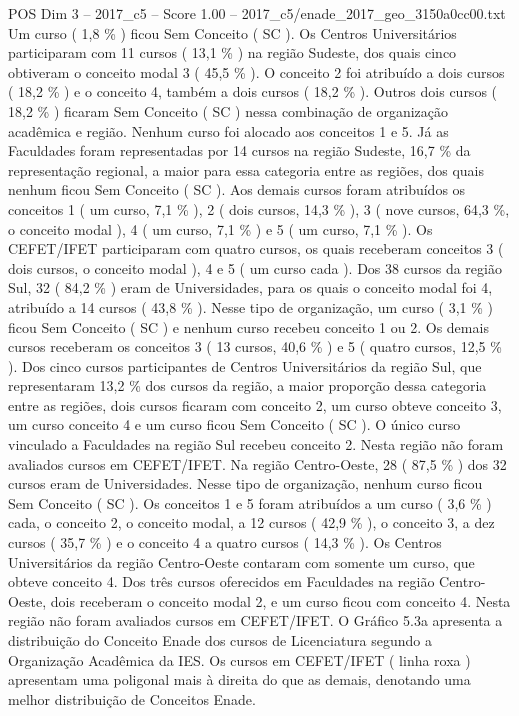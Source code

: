 \begin{textsample}{POS Dim 3 – 2017\_c5 – Score 1.00 – 2017\_c5/enade\_2017\_geo\_3150a0cc00.txt}
Um curso ( 1,8 \% ) ficou Sem Conceito ( SC ).
Os Centros Universitários participaram com 11 cursos ( 13,1 \% ) na região Sudeste, dos quais cinco obtiveram o conceito modal 3 ( 45,5 \% ).
O conceito 2 foi atribuído a dois cursos ( 18,2 \% ) e o conceito 4, também a dois cursos ( 18,2 \% ).
Outros dois cursos ( 18,2 \% ) ficaram Sem Conceito ( SC ) nessa combinação de organização acadêmica e região.
Nenhum curso foi alocado aos conceitos 1 e 5.
Já as Faculdades foram representadas por 14 cursos na região Sudeste, 16,7 \% da representação regional, a maior para essa categoria entre as regiões, dos quais nenhum ficou Sem Conceito ( SC ).
Aos demais cursos foram atribuídos os conceitos 1 ( um curso, 7,1 \% ), 2 ( dois cursos, 14,3 \% ), 3 ( nove cursos, 64,3 \%, o conceito modal ), 4 ( um curso, 7,1 \% ) e 5 ( um curso, 7,1 \% ).
Os CEFET/IFET participaram com quatro cursos, os quais receberam conceitos 3 ( dois cursos, o conceito modal ), 4 e 5 ( um curso cada ).
Dos 38 cursos da região Sul, 32 ( 84,2 \% ) eram de Universidades, para os quais o conceito modal foi 4, atribuído a 14 cursos ( 43,8 \% ).
Nesse tipo de organização, um curso ( 3,1 \% ) ficou Sem Conceito ( SC ) e nenhum curso recebeu conceito 1 ou 2.
Os demais cursos receberam os conceitos 3 ( 13 cursos, 40,6 \% ) e 5 ( quatro cursos, 12,5 \% ).
Dos cinco cursos participantes de Centros Universitários da região Sul, que representaram 13,2 \% dos cursos da região, a maior proporção dessa categoria entre as regiões, dois cursos ficaram com conceito 2, um curso obteve conceito 3, um curso conceito 4 e um curso ficou Sem Conceito ( SC ).
O único curso vinculado a Faculdades na região Sul recebeu conceito 2.
Nesta região não foram avaliados cursos em CEFET/IFET.
Na região Centro-Oeste, 28 ( 87,5 \% ) dos 32 cursos eram de Universidades.
Nesse tipo de organização, nenhum curso ficou Sem Conceito ( SC ).
Os conceitos 1 e 5 foram atribuídos a um curso ( 3,6 \% ) cada, o conceito 2, o conceito modal, a 12 cursos ( 42,9 \% ), o conceito 3, a dez cursos ( 35,7 \% ) e o conceito 4 a quatro cursos ( 14,3 \% ).
Os Centros Universitários da região Centro-Oeste contaram com somente um curso, que obteve conceito 4.
Dos três cursos oferecidos em Faculdades na região Centro-Oeste, dois receberam o conceito modal 2, e um curso ficou com conceito 4.
Nesta região não foram avaliados cursos em CEFET/IFET.
O Gráfico 5.3a apresenta a distribuição do Conceito Enade dos cursos de Licenciatura segundo a Organização Acadêmica da IES.
Os cursos em CEFET/IFET ( linha roxa ) apresentam uma poligonal mais à direita do que as demais, denotando uma melhor distribuição de Conceitos Enade.

\end{textsample}
